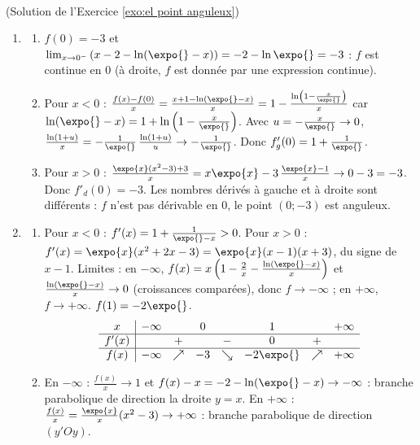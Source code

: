 \begin{corrige}
\begin{sol} ~ \\
(Solution de l'Exercice \ref{exo:el point anguleux})
\begin{enumerate}
\item \begin{enumerate}
      \item $f(0) = -3$ et $\lim_{x\to0^-} \left(x - 2 - \ln(\expo{} - x)\right) = -2 - \ln \expo{} = -3$ : $f$ est continue en $0$
            (\`a droite, $f$ est donn\'ee par une expression continue).
      \item Pour $x < 0$ : $\frac{f(x) - f(0)}{x} = \frac{x + 1 - \ln(\expo{} - x)}{x} = 1 - \frac{\ln\left(1 - \frac{x}{\expo{}}\right)}{x}$
            car $\ln(\expo{} - x) = 1 + \ln\left(1 - \frac{x}{\expo{}}\right)$. Avec $u = -\frac{x}{\expo{}} \to 0$,
            $\frac{\ln(1+u)}{x} = -\frac{1}{\expo{}}\,\frac{\ln(1+u)}{u} \to -\frac{1}{\expo{}}$. Donc $f'_g(0) = 1 + \frac{1}{\expo{}}$.
      \item Pour $x > 0$ : $\frac{\expo{x}(x^2-3) + 3}{x} = x\expo{x} - 3\,\frac{\expo{x} - 1}{x} \to 0 - 3 = -3$. Donc $f'_d(0) = -3$.
            Les nombres d\'eriv\'es \`a gauche et \`a droite sont diff\'erents : $f$ n'est pas d\'erivable en $0$, le point $(0;-3)$ est anguleux.
      \end{enumerate}
\item \begin{enumerate}
      \item Pour $x < 0$ : $f'(x) = 1 + \frac{1}{\expo{} - x} > 0$.
            Pour $x > 0$ : $f'(x) = \expo{x}(x^2 + 2x - 3) = \expo{x}(x-1)(x+3)$, du signe de $x - 1$.
            Limites : en $-\infty$, $f(x) = x\left(1 - \frac{2}{x} - \frac{\ln(\expo{} - x)}{x}\right)$ et $\frac{\ln(\expo{}-x)}{x} \to 0$
            (croissances compar\'ees), donc $f \to -\infty$ ; en $+\infty$, $f \to +\infty$. $f(1) = -2\expo{}$.
            \[
            \begin{array}{c|ccccccc}
            x & -\infty & & 0 & & 1 & & +\infty \\ \hline
            f'(x) & & + & & - & 0 & + & \\ \hline
            f(x) & -\infty & \nearrow & -3 & \searrow & -2\expo{} & \nearrow & +\infty
            \end{array}
            \]
      \item En $-\infty$ : $\frac{f(x)}{x} \to 1$ et $f(x) - x = -2 - \ln(\expo{} - x) \to -\infty$ : branche parabolique de direction la droite $y = x$.
            En $+\infty$ : $\frac{f(x)}{x} = \frac{\expo{x}}{x}(x^2 - 3) \to +\infty$ : branche parabolique de direction $(y'Oy)$.

\end{enumerate}
\end{enumerate}
\end{sol}
\end{corrige}
